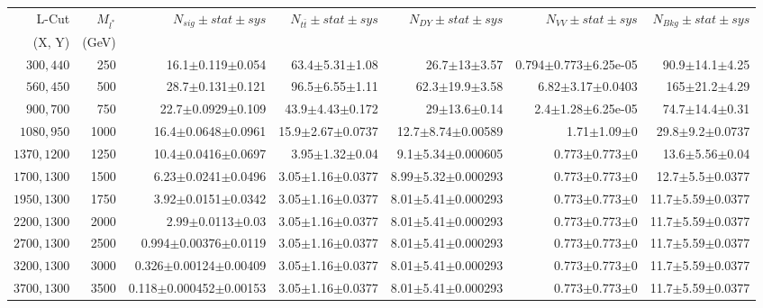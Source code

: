 \documentclass[]{article}
\begin{document}
\begin{table}
\begin{center}
\scriptsize{
\begin{tabular}{ |r|r|r|r|r|r|r|}
\hline 
L-Cut & $M_{l^*}$ & $N_{sig}\pm stat \pm sys $ &$N_{t\bar{t}}\pm stat \pm sys $ & $N_{DY}\pm stat \pm sys $ & $N_{VV}\pm stat \pm sys $ &$N_{Bkg}\pm stat \pm sys$\\
(X, Y) & (GeV) & && &&\\
\hline 
$300, 440$ & 250 & 16.1$\pm$0.119$\pm$0.054 & 63.4$\pm$5.31$\pm$1.08 & 26.7$\pm$13$\pm$3.57 & 0.794$\pm$0.773$\pm$6.25e-05 & 90.9$\pm$14.1$\pm$4.25 \\
$560, 450$ & 500 & 28.7$\pm$0.131$\pm$0.121 & 96.5$\pm$6.55$\pm$1.11 & 62.3$\pm$19.9$\pm$3.58 & 6.82$\pm$3.17$\pm$0.0403 & 165$\pm$21.2$\pm$4.29 \\
$900, 700$ & 750 & 22.7$\pm$0.0929$\pm$0.109 & 43.9$\pm$4.43$\pm$0.172 & 29$\pm$13.6$\pm$0.14 & 2.4$\pm$1.28$\pm$6.25e-05 & 74.7$\pm$14.4$\pm$0.31 \\
$1080,950$ & 1000 & 16.4$\pm$0.0648$\pm$0.0961 & 15.9$\pm$2.67$\pm$0.0737 & 12.7$\pm$8.74$\pm$0.00589 & 1.71$\pm$1.09$\pm$0 & 29.8$\pm$9.2$\pm$0.0737 \\
$1370,1200$ & 1250 & 10.4$\pm$0.0416$\pm$0.0697 & 3.95$\pm$1.32$\pm$0.04 & 9.1$\pm$5.34$\pm$0.000605 & 0.773$\pm$0.773$\pm$0 & 13.6$\pm$5.56$\pm$0.04 \\
$1700,1300$ & 1500 & 6.23$\pm$0.0241$\pm$0.0496 & 3.05$\pm$1.16$\pm$0.0377 & 8.99$\pm$5.32$\pm$0.000293 & 0.773$\pm$0.773$\pm$0 & 12.7$\pm$5.5$\pm$0.0377 \\
$1950,1300$ & 1750 & 3.92$\pm$0.0151$\pm$0.0342 & 3.05$\pm$1.16$\pm$0.0377 & 8.01$\pm$5.41$\pm$0.000293 & 0.773$\pm$0.773$\pm$0 & 11.7$\pm$5.59$\pm$0.0377 \\
$2200,1300$ & 2000 & 2.99$\pm$0.0113$\pm$0.03 & 3.05$\pm$1.16$\pm$0.0377 & 8.01$\pm$5.41$\pm$0.000293 & 0.773$\pm$0.773$\pm$0 & 11.7$\pm$5.59$\pm$0.0377 \\
$2700,1300$ & 2500 & 0.994$\pm$0.00376$\pm$0.0119 & 3.05$\pm$1.16$\pm$0.0377 & 8.01$\pm$5.41$\pm$0.000293 & 0.773$\pm$0.773$\pm$0 & 11.7$\pm$5.59$\pm$0.0377 \\
$3200,1300$ & 3000 & 0.326$\pm$0.00124$\pm$0.00409 & 3.05$\pm$1.16$\pm$0.0377 & 8.01$\pm$5.41$\pm$0.000293 & 0.773$\pm$0.773$\pm$0 & 11.7$\pm$5.59$\pm$0.0377 \\
$3700,1300$ & 3500 & 0.118$\pm$0.000452$\pm$0.00153 & 3.05$\pm$1.16$\pm$0.0377 & 8.01$\pm$5.41$\pm$0.000293 & 0.773$\pm$0.773$\pm$0 & 11.7$\pm$5.59$\pm$0.0377 \\

\end{tabular}}
\end{center}
\end{table}
\end{document}
